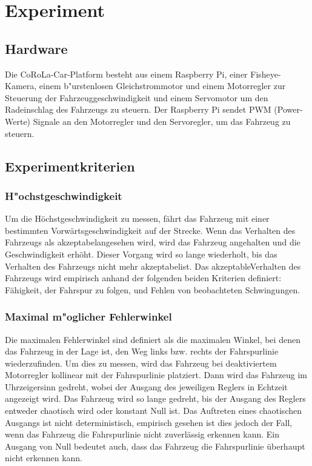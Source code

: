 \documentclass[arbeit=studie,oneside,BCOR=12mm]{ArbeitRST}
\begin{document}
\chapter{Experiment}
\section{Hardware}

Die CoRoLa-Car-Platform besteht aus einem Raspberry Pi, einer Fisheye-Kamera,
einem b"urstenlosen Gleichstrommotor und einem Motorregler zur Steuerung der
Fahrzeuggeschwindigkeit und einem Servomotor um den Radeinschlag des Fahrzeugs
zu steuern. Der Raspberry Pi sendet PWM (Power-Werte) Signale an den Motorregler und den
Servoregler, um das Fahrzeug zu steuern. 

\section{Experimentkriterien}

\subsection{H"ochstgeschwindigkeit}

Um die Höchstgeschwindigkeit zu messen, fährt das Fahrzeug mit einer bestimmten
Vorwärtsgeschwindigkeit auf der Strecke. Wenn das Verhalten des Fahrzeugs als
\glqq akzeptabel\grqq angesehen wird, wird das Fahrzeug angehalten und die
Geschwindigkeit erhöht. Dieser Vorgang wird so lange wiederholt, bis das
Verhalten des Fahrzeugs nicht mehr \glqq akzeptabel\grqq ist. Das \glqq
akzeptable\grqq Verhalten des Fahrzeugs wird empirisch anhand der folgenden
beiden Kriterien definiert: Fähigkeit, der Fahrspur zu folgen, und Fehlen von
beobachteten Schwingungen.

\subsection{Maximal m"oglicher Fehlerwinkel}

Die maximalen Fehlerwinkel sind definiert als die maximalen Winkel, bei denen
das Fahrzeug in der Lage ist, den Weg links bzw. rechts der Fahrspurlinie
wiederzufinden. Um dies zu messen, wird das Fahrzeug bei deaktiviertem
Motorregler kollinear mit der Fahrspurlinie platziert. Dann wird das Fahrzeug
im Uhrzeigersinn gedreht, wobei der Ausgang des jeweiligen Reglers in Echtzeit
angezeigt wird. Das Fahrzeug wird so lange gedreht, bis der Ausgang des Reglers
entweder chaotisch wird oder konstant Null ist. Das Auftreten eines
chaotischen Ausgangs ist nicht deterministisch, empirisch gesehen ist dies
jedoch der Fall, wenn das Fahrzeug die Fahrspurlinie nicht zuverlässig erkennen
kann. Ein Ausgang von Null bedeutet auch, dass das Fahrzeug die Fahrspurlinie
überhaupt nicht erkennen kann.
\end{document}
